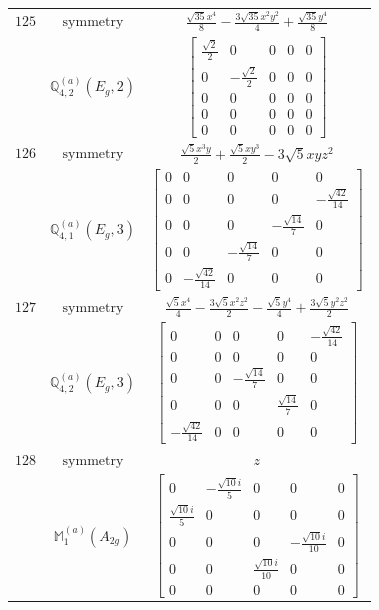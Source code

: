 \documentclass[fleqn,8pt,landscape]{jsarticle}
\begin{document}
\begin{longtable}{ccc}
$ 125 $ & $ \text{symmetry} $ & $ \frac{\sqrt{35} x^{4}}{8} - \frac{3 \sqrt{35} x^{2} y^{2}}{4} + \frac{\sqrt{35} y^{4}}{8} $ \\
$  $ & $ \mathbb{Q}_{4,2}^{(a)}(E_{g},2) $ & $ \begin{bmatrix} \frac{\sqrt{2}}{2} & 0 & 0 & 0 & 0 \\ 0 & - \frac{\sqrt{2}}{2} & 0 & 0 & 0 \\ 0 & 0 & 0 & 0 & 0 \\ 0 & 0 & 0 & 0 & 0 \\ 0 & 0 & 0 & 0 & 0 \end{bmatrix} $ \\ \hline
$ 126 $ & $ \text{symmetry} $ & $ \frac{\sqrt{5} x^{3} y}{2} + \frac{\sqrt{5} x y^{3}}{2} - 3 \sqrt{5} x y z^{2} $ \\
$  $ & $ \mathbb{Q}_{4,1}^{(a)}(E_{g},3) $ & $ \begin{bmatrix} 0 & 0 & 0 & 0 & 0 \\ 0 & 0 & 0 & 0 & - \frac{\sqrt{42}}{14} \\ 0 & 0 & 0 & - \frac{\sqrt{14}}{7} & 0 \\ 0 & 0 & - \frac{\sqrt{14}}{7} & 0 & 0 \\ 0 & - \frac{\sqrt{42}}{14} & 0 & 0 & 0 \end{bmatrix} $ \\ \hline
$ 127 $ & $ \text{symmetry} $ & $ \frac{\sqrt{5} x^{4}}{4} - \frac{3 \sqrt{5} x^{2} z^{2}}{2} - \frac{\sqrt{5} y^{4}}{4} + \frac{3 \sqrt{5} y^{2} z^{2}}{2} $ \\
$  $ & $ \mathbb{Q}_{4,2}^{(a)}(E_{g},3) $ & $ \begin{bmatrix} 0 & 0 & 0 & 0 & - \frac{\sqrt{42}}{14} \\ 0 & 0 & 0 & 0 & 0 \\ 0 & 0 & - \frac{\sqrt{14}}{7} & 0 & 0 \\ 0 & 0 & 0 & \frac{\sqrt{14}}{7} & 0 \\ - \frac{\sqrt{42}}{14} & 0 & 0 & 0 & 0 \end{bmatrix} $ \\ \hline
$ 128 $ & $ \text{symmetry} $ & $ z $ \\
$  $ & $ \mathbb{M}_{1}^{(a)}(A_{2g}) $ & $ \begin{bmatrix} 0 & - \frac{\sqrt{10} i}{5} & 0 & 0 & 0 \\ \frac{\sqrt{10} i}{5} & 0 & 0 & 0 & 0 \\ 0 & 0 & 0 & - \frac{\sqrt{10} i}{10} & 0 \\ 0 & 0 & \frac{\sqrt{10} i}{10} & 0 & 0 \\ 0 & 0 & 0 & 0 & 0 \end{bmatrix} $ \\ \hline

\end{longtable}
\end{document}

